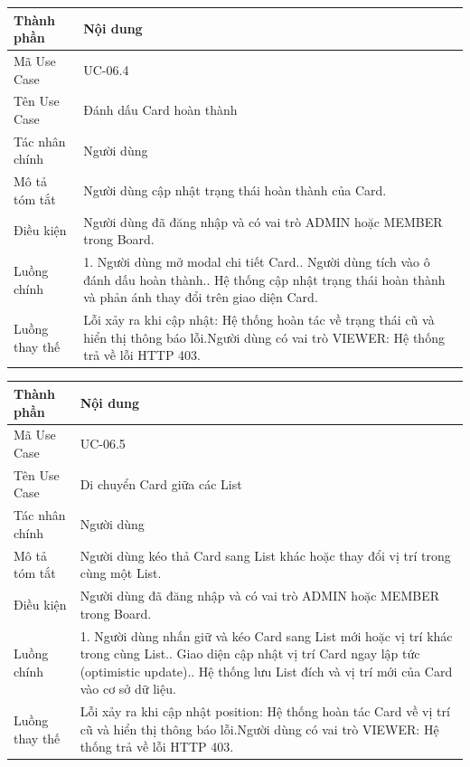 \vspace{0.5cm}
\noindent\begin{tabular}{|p{3.5cm}|p{10.5cm}|}
\hline
\textbf{Thành phần} & \textbf{Nội dung} \\
\hline
Mã Use Case & UC-06.4 \\
\hline
Tên Use Case & Đánh dấu Card hoàn thành \\
\hline
Tác nhân chính & Người dùng \\
\hline
Mô tả tóm tắt & Người dùng cập nhật trạng thái hoàn thành của Card. \\
\hline
Điều kiện & Người dùng đã đăng nhập và có vai trò ADMIN hoặc MEMBER trong Board. \\
\hline
Luồng chính & 1. Người dùng mở modal chi tiết Card.\newline 2. Người dùng tích vào ô đánh dấu hoàn thành.\newline 3. Hệ thống cập nhật trạng thái hoàn thành và phản ánh thay đổi trên giao diện Card. \\
\hline
Luồng thay thế & Lỗi xảy ra khi cập nhật: Hệ thống hoàn tác về trạng thái cũ và hiển thị thông báo lỗi.\newline Người dùng có vai trò VIEWER: Hệ thống trả về lỗi HTTP 403. \\
\hline
\end{tabular}

\vspace{0.5cm}
\noindent\begin{tabular}{|p{3.5cm}|p{10.5cm}|}
\hline
\textbf{Thành phần} & \textbf{Nội dung} \\
\hline
Mã Use Case & UC-06.5 \\
\hline
Tên Use Case & Di chuyển Card giữa các List \\
\hline
Tác nhân chính & Người dùng \\
\hline
Mô tả tóm tắt & Người dùng kéo thả Card sang List khác hoặc thay đổi vị trí trong cùng một List. \\
\hline
Điều kiện & Người dùng đã đăng nhập và có vai trò ADMIN hoặc MEMBER trong Board. \\
\hline
Luồng chính & 1. Người dùng nhấn giữ và kéo Card sang List mới hoặc vị trí khác trong cùng List.\newline 2. Giao diện cập nhật vị trí Card ngay lập tức (optimistic update).\newline 3. Hệ thống lưu List đích và vị trí mới của Card vào cơ sở dữ liệu. \\
\hline
Luồng thay thế & Lỗi xảy ra khi cập nhật position: Hệ thống hoàn tác Card về vị trí cũ và hiển thị thông báo lỗi.\newline Người dùng có vai trò VIEWER: Hệ thống trả về lỗi HTTP 403. \\
\hline
\end{tabular}

